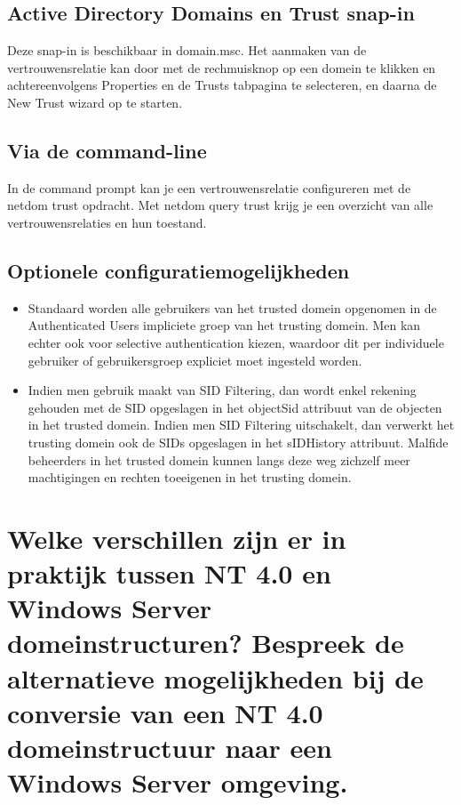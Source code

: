 \subsection{Active Directory Domains en Trust snap-in}

Deze snap-in is beschikbaar in domain.msc. Het aanmaken van de
vertrouwensrelatie kan door met de rechmuisknop op een domein te klikken en
achtereenvolgens Properties en de Trusts tabpagina te selecteren, en daarna de
New Trust wizard op te starten.

\subsection{Via de command-line}

In de command prompt kan je een vertrouwensrelatie configureren met de netdom
trust opdracht. Met netdom query trust krijg je een overzicht van alle
vertrouwensrelaties en hun toestand.

\subsection{Optionele configuratiemogelijkheden}
\begin{itemize}
	\item Standaard worden alle gebruikers van het trusted domein opgenomen
		in de Authenticated Users impliciete groep van het trusting
		domein. Men kan echter ook voor selective authentication kiezen,
		waardoor dit per individuele gebruiker of gebruikersgroep
		expliciet moet ingesteld worden.
	\item Indien men gebruik maakt van SID Filtering, dan wordt enkel
		rekening gehouden met de SID opgeslagen in het objectSid
		attribuut van de objecten in het trusted domein. Indien men SID
		Filtering uitschakelt, dan verwerkt het trusting domein ook de
		SIDs opgeslagen in het sIDHistory attribuut. Malfide beheerders
		in het trusted domein kunnen langs deze weg zichzelf meer
		machtigingen en rechten toeeigenen in het trusting domein.
\end{itemize}

\section{Welke verschillen zijn er in praktijk tussen NT 4.0 en Windows Server
domeinstructuren? Bespreek de alternatieve mogelijkheden bij de conversie van
een NT 4.0 domeinstructuur naar een Windows Server omgeving.}

